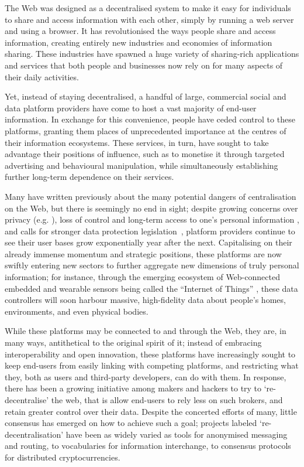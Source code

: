 \documentclass{amsart}
\begin{document}
The Web was designed as a decentralised system to make it easy for individuals to share and access information with each other, simply by running a web server and using a browser.  It has revolutionised the ways people share and access information, creating entirely new industries and economies of information sharing.  These industries have spawned a huge variety of sharing-rich applications and services that both people and businesses now rely on for many aspects of their daily activities.  

Yet, instead of staying decentralised, a handful of large, commercial social and data platform providers have come to host a vast majority of end-user information.  In exchange for this convenience, people have ceded control to these platforms, granting them places of unprecedented importance at the centres of their information ecosystems. These services, in turn, have sought to take advantage their positions of influence, such as to monetise it through targeted advertising and behavioural manipulation, while simultaneously establishing further long-term dependence on their services.

Many have written previously about the many potential dangers of centralisation on the Web, but there is seemingly no end in sight; despite growing concerns over privacy (e.g. \cite{}), loss of control and long-term access to one's personal information \cite{}, and calls for stronger data protection legislation~\cite{}, platform providers continue to see their user bases grow exponentially year after the next.   Capitalising on their already immense momentum and strategic positions, these platforms are now swiftly entering new sectors to further aggregate new dimensions of truly personal information; for instance, through the emerging ecosystem of Web-connected embedded and wearable sensors being called the ``Internet of Things'' \cite{}, these data controllers will soon harbour massive, high-fidelity data about people's homes, environments, and even physical bodies.

While these platforms may be connected to and through the Web, they are, in many ways, antithetical to the original spirit of it; instead of embracing interoperability and open innovation, these platforms have increasingly sought to keep end-users from easily linking with competing platforms, and restricting what they, both as users and third-party developers, can do with them.  In response, there has been a growing initiative among makers and hackers to try to `re-decentralise' the web, that is allow end-users to rely less on such brokers, and retain greater control over their data.  Despite the concerted efforts of many, little consensus has emerged on how to achieve such a goal; projects labeled `re-decentralisation' have been as widely varied as tools for anonymised messaging and routing, to vocabularies for information interchange, to consensus protocols for distributed cryptocurrencies.
\end{document}
